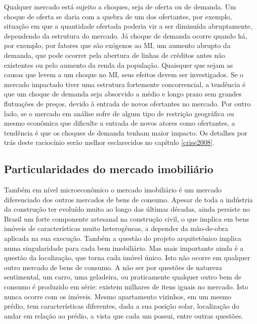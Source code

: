 \documentclass[
	12pt,				%
	oneside,			%
	a4paper,			%
	chapter=TITLE,		%
	section=TITLE,		%
	english,			%
	brazil				%
	]{abntex2}
\begin{document}
Qualquer mercado está sujeito a choques, seja de oferta ou de demanda. Um choque
de oferta se daria com a quebra de um dos ofertantes, por exemplo, situação em
que a quantidade ofertada poderia vir a ser diminuída abruptamente, dependendo
da estrutura do mercado. Já choque de demanda ocorre quando há, por exemplo, por
fatores que são exógenos ao \gls{MI}, um aumento abrupto da demanda, que pode
ocorrer pela abertura de linhas de créditos antes não existentes ou pelo aumento
da renda da população. Quaisquer que sejam as causas que levem a um choque no
\gls{MI}, seus efeitos devem ser investigados. Se o mercado impactado tiver uma
estrutura fortemente concorrencial, a tendência é que um choque de demanda seja
absorvido a médio e longo prazo sem grandes flutuações de preços, devido à
entrada de novos ofertantes no mercado. Por outro lado, se o mercado em análise
sofre de algum tipo de restrição geográfica ou mesmo econômica que dificulte a
entrada de novos atores como ofertantes, a tendência é que os choques de demanda
tenham maior impacto. Os detalhes por trás deste raciocínio serão melhor
esclarecidos no capítulo \ref{crise2008}.

\hypertarget{particularidades-do-mercado-imobiliuxe1rio}{%
\subsection{Particularidades do mercado imobiliário}\label{particularidades-do-mercado-imobiliuxe1rio}}

Também em nível microeconômico o mercado imobiliário é um mercado diferenciado
dos outros mercados de bens de consumo. Apesar de toda a indústria da construção
ter evoluído muito ao longo das últimas décadas, ainda persiste no Brasil um
forte componente artesanal na construção civil, o que implica em bens imóveis
de características muito heterogêneas, a depender da mão-de-obra aplicada na sua
execução. Também a questão do projeto arquitetônico implica numa singularidade
para cada bem imobiliário. Mas mais importante ainda é a questão da localização,
que torna cada imóvel único. Isto não ocorre em qualquer outro mercado de bens
de consumo. A não ser por questões de natureza sentimental, um carro, uma
geladeira, ou praticamente qualquer outro bem de consumo é produzido em série:
existem milhares de itens iguais no mercado. Isto nunca ocorre com os imóveis.
Mesmo apartamento vizinhos, em um mesmo prédio, tem características diferentes,
dada a sua posição solar, localização do andar em relação ao prédio, a vista
que cada um possui, entre outras questões.
\end{document}
